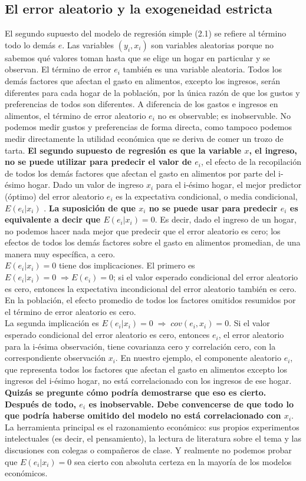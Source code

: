 \subsection{El error aleatorio y la exogeneidad estricta}
El segundo supuesto del modelo de regresión simple (2.1) se refiere al término todo lo demás $e$. Las variables $( y_i , x_i )$ son variables aleatorias porque no sabemos qué valores toman hasta que se elige un hogar en particular y se observan. El término de error $e_i$ también es una variable aleatoria. Todos los demás factores que afectan el gasto en alimentos, excepto los ingresos, serán diferentes para cada hogar de la población, por la única razón de que los gustos y preferencias de todos son diferentes. A diferencia de los gastos e ingresos en alimentos, el término de error aleatorio $e_i$ no es observable; es inobservable. No podemos medir gustos y preferencias de forma directa, como tampoco podemos medir directamente la utilidad económica que se deriva de comer un trozo de tarta. \textbf{El segundo supuesto de regresión es que la variable $x$, el ingreso, no se puede utilizar para predecir el valor de $e_i$}, el efecto de la recopilación de todos los demás factores que afectan el gasto en alimentos por parte del i-ésimo hogar. Dado un valor de ingreso $x_i$ para el i-ésimo hogar, el mejor predictor (óptimo) del error aleatorio $e_i$ es la expectativa condicional, o media condicional, $E ( e_i | x_i )$ . \textbf{La suposición de que $x_i$ no se puede usar para predecir $e_i$ es equivalente a decir que $E ( e_i | x_i ) = 0$}. Es decir, dado el ingreso de un hogar, no podemos hacer nada mejor que predecir que el error aleatorio es cero; los efectos de todos los demás factores sobre el gasto en alimentos promedian, de una manera muy específica, a cero. \\
$E ( e_i | x_i ) = 0$ tiene dos implicaciones. El primero es $E ( e_i | x_i ) = 0 \; \Longrightarrow   E ( e_i) = 0$; si el valor esperado condicional del error aleatorio es cero, entonces la expectativa incondicional del error aleatorio también es cero. En la población, el efecto promedio de todos los factores omitidos resumidos por el término de error aleatorio es cero.\\
La segunda implicación es $E ( e_i | x_i ) = 0 \; \Longrightarrow \; cov( e_i , x_i ) = 0$. Si el valor esperado condicional del error aleatorio es cero, entonces $e_i$, el error aleatorio para la i-ésima observación, tiene covarianza cero y correlación cero, con la correspondiente observación $x_i$. En nuestro ejemplo, el componente aleatorio $e_i$, que representa todos los factores que afectan el gasto en alimentos excepto los ingresos del i-ésimo hogar, no está correlacionado con los ingresos de ese hogar. \textbf{Quizás se pregunte cómo podría demostrarse que eso es cierto. Después de todo, $e_i$ es inobservable. Debe convencerse de que todo lo que podría haberse omitido del modelo no está correlacionado con $x_i$}. La herramienta principal es el razonamiento económico: sus propios experimentos intelectuales (es decir, el pensamiento), la lectura de literatura sobre el tema y las discusiones con colegas o compañeros de clase. Y realmente no podemos probar que $E( e_i | x_i ) = 0$ sea cierto con absoluta certeza en la mayoría de los modelos económicos.\\
